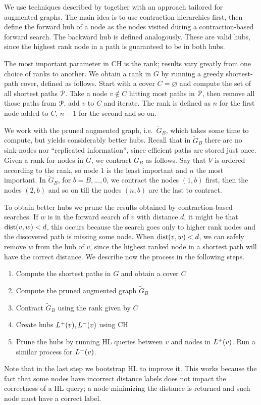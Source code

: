 We use techniques described by \cite{hubimplem} together with an approach tailored for augmented graphs.
The main idea is to use contraction hierarchies first, then define the forward hub of a node as the nodes visited during a contraction-based forward search.
The backward hub is defined analogously.
These are valid hubs, since the highest rank node in a path is guaranteed to be in both hubs.

The most important parameter in CH is the rank; results vary greatly from one choice of ranks to another.
We obtain a rank in $G$ by running a greedy shortest-path cover, defined as follows.
Start with a cover $C=\varnothing$ and compute the set of all shortest paths $\mathcal{P}$.
Take a node $v\notin C$ hitting most paths in $\mathcal{P}$, then remove all those paths from $\mathcal{P}$, add $v$ to $C$ and iterate.
The rank is defined as $n$ for the first node added to $C$, $n-1$ for the second and so on.

We work with the pruned augmented graph, i.e.\ $\tilde G_B$, which takes some time to compute, but yields considerably better hubs. 
Recall that in $\tilde G_B$ there are no sink-nodes nor ``replicated information'', since efficient paths are stored just once.
Given a rank for nodes in $G$, we contract $\tilde G_B$ as follows.
Say that $V$ is ordered according to the rank, so node $1$ is the least important and $n$ the most important.
In $\tilde G_B$, for $b=B,\ldots,0$, we contract the nodes $(1,b)$ first, then the nodes $(2,b)$ and so on till the nodes $(n,b)$ are the last to contract. 

To obtain better hubs we prune the results obtained by contraction-based searches.
If $w$ is in the forward search of $v$ with distance $d$, it might be that $\text{dist}(v,w)<d$, this occurs because the search goes only to higher rank nodes and the discovered path is missing some node.
When $\text{dist}(v,w)<d$, we can safely remove $w$ from the hub of $v$, since the highest ranked node in a shortest path will have the correct distance.
We describe now the process in the following steps.

\begin{enumerate}
\item Compute the shortest paths in $G$ and obtain a cover $C$
\item Compute the pruned augmented graph $\tilde G_B$
\item Contract $\tilde G_B$ using the rank given by $C$
\item Create hubs $L^+(v),L^-(v)$ using CH
\item Prune the hubs by running HL queries between $v$ and nodes in $L^+(v)$. 
Run a similar process for $L^-(v)$.
\end{enumerate}
Note that in the last step we bootstrap HL to improve it.
This works because the fact that some nodes have incorrect distance labels does not impact the correctness of a HL query; a node minimizing the distance is returned and such node must have a correct label.

